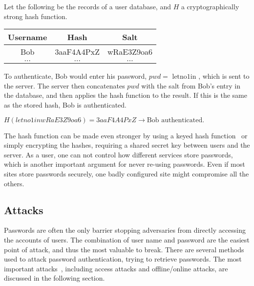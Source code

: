 \begin{example}
Let the following be the records of a user database, and $H$ a cryptographically strong hash function.
    \begin{table}[ht!]
        \centering
    \begin{tabular}{|c|c|c|}
        \hline
        Username & Hash & Salt \\
        \hline
        Bob & 3aaF4A4PxZ & wRaE3Z9oa6 \\
        \hline
        $\dots$ & $\dots$ & $\dots$ \\
        \hline
    \end{tabular}
    \end{table}
\par To authenticate, Bob would enter his password, $pwd=\text{ letno1in }$, which is sent to the server. The server then concatenates $pwd$ with the salt from Bob's entry in the database, and then applies the hash function to the result. If this is the same as the stored hash, Bob is authenticated.\\
 \centerline{   $H(letno1inwRaE3Z9oa6) = 3aaF4A4PxZ \rightarrow \text{Bob authenticated}.$  }

\end{example}



The hash function can be made even stronger by using a keyed hash function~\cite{keyedhash} or simply encrypting the hashes, requiring a shared secret key between users and the server. As a user, one can not control how different services store passwords, which is another important argument for never re-using passwords. Even if most sites store passwords securely, one badly configured site might compromise all the others. 



\subsection{Attacks}\label{atck}
Passwords are often the only barrier stopping adversaries from directly accessing the accounts of users. The combination of user name and password are the easiest point of attack, and thus the most valuable to break. There are several methods used to attack password authentication, trying to retrieve passwords. The most important attacks~\cite{nist-guide, strong-pws_florencio}, including access attacks and offline/online attacks, are discussed in the following section. 
